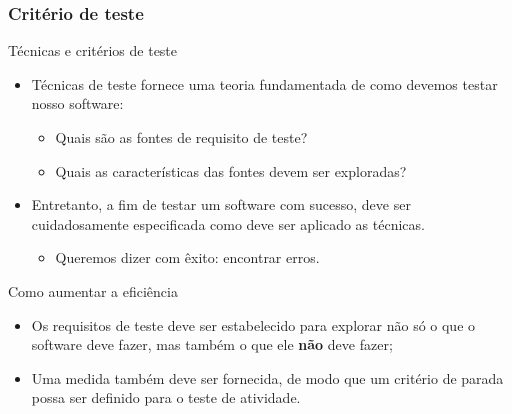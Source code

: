 \begin{frame}[parent={cmap:software-testing-foundations}, hasprev=false, hasnext=true]
\frametitle{Critério de teste}

\begin{block:fact}{Técnicas e critérios de teste}
\begin{itemize}
	\item Técnicas de teste fornece uma teoria fundamentada de como devemos testar nosso software:
	\begin{itemize}
		\item Quais são as fontes de requisito de teste?

		\item Quais as características das fontes devem ser exploradas?
	\end{itemize}

	\item Entretanto, a fim de testar um software com sucesso, deve ser cuidadosamente especificada como deve ser aplicado as técnicas.
	\begin{itemize}
		\item Queremos dizer com êxito: encontrar erros.
	\end{itemize}
\end{itemize}
\end{block:fact}


\begin{block:fact}{Como aumentar a eficiência}
\begin{itemize}
	\item Os requisitos de teste deve ser estabelecido para explorar não só o que o software deve fazer, mas também o que ele \textbf{não} deve fazer;

	\item Uma medida também deve ser fornecida, de modo que um critério de parada possa ser definido para o teste de atividade.
\end{itemize}
\end{block:fact}
\end{frame}



